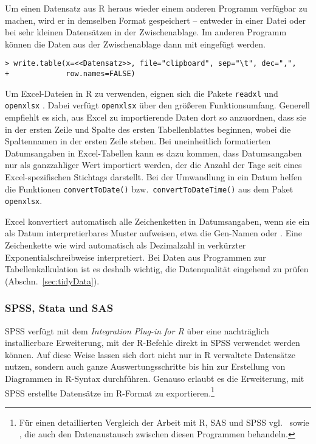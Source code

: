 Um einen Datensatz aus R heraus wieder einem anderen Programm verfügbar zu machen, wird er in demselben Format gespeichert -- entweder in einer Datei oder bei sehr kleinen Datensätzen in der Zwischenablage. Im anderen Programm können die Daten aus der Zwischenablage dann mit  eingefügt werden.
\begin{lstlisting}
> write.table(x=<<Datensatz>>, file="clipboard", sep="\t", dec=",",
+             row.names=FALSE)
\end{lstlisting}

Um Excel-Dateien in R zu verwenden, eignen sich die Pakete \lstinline!readxl! \cite{Wickham2015a} und \lstinline!openxlsx! \cite{Walker2015}. Dabei verfügt \lstinline!openxlsx! über den größeren Funktionsumfang. Generell empfiehlt es sich, aus Excel zu importierende Daten dort so anzuordnen, dass sie in der ersten Zeile und Spalte des ersten Tabellenblattes beginnen, wobei die Spaltennamen in der ersten Zeile stehen. Bei uneinheitlich formatierten Datumsangaben in Excel-Tabellen kann es dazu kommen, dass Datumsangaben nur als ganzzahliger Wert importiert werden, der die Anzahl der Tage seit eines Excel-spezifischen Stichtags darstellt. Bei der Umwandlung in ein Datum helfen die Funktionen \lstinline!convertToDate()! bzw.\ \lstinline!convertToDateTime()! aus dem Paket \lstinline!openxlsx!.

Excel konvertiert automatisch alle Zeichenketten in Datumsangaben, wenn sie ein als Datum interpretierbares Muster aufweisen, etwa die Gen-Namen  oder . Eine Zeichenkette wie  wird automatisch als Dezimalzahl in verkürzter Exponentialschreibweise interpretiert. Bei Daten aus Programmen zur Tabellenkalkulation ist es deshalb wichtig, die Datenqualität eingehend zu prüfen (Abschn.\ \ref{sec:tidyData}).

\subsubsection{SPSS, Stata und SAS}

SPSS verfügt mit dem \emph{Integration Plug-in for R} über eine nachträglich installierbare Erweiterung, mit der R-Befehle direkt in SPSS verwendet werden können. Auf diese Weise lassen sich dort nicht nur in R verwaltete Datensätze nutzen, sondern auch ganze Auswertungsschritte bis hin zur Erstellung von Diagrammen in R-Syntax durchführen. Genauso erlaubt es die Erweiterung, mit SPSS erstellte Datensätze im R-Format zu exportieren.\footnote{Für einen detaillierten Vergleich der Arbeit mit R, SAS und SPSS vgl.\  sowie , die auch den Datenaustausch zwischen diesen Programmen behandeln.}

